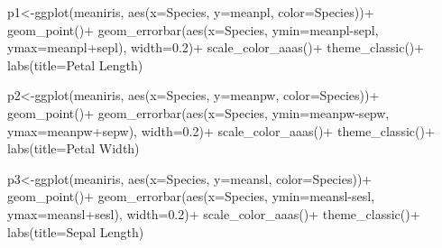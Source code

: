 \documentclass[
  letterpaper,
  DIV=11,
  numbers=noendperiod]{scrartcl}
\newenvironment{Shaded}{\begin{snugshade}}{\end{snugshade}}
\newcommand{\AttributeTok}[1]{\textcolor[rgb]{0.40,0.45,0.13}{#1}}
\newcommand{\FloatTok}[1]{\textcolor[rgb]{0.68,0.00,0.00}{#1}}
\newcommand{\FunctionTok}[1]{\textcolor[rgb]{0.28,0.35,0.67}{#1}}
\newcommand{\NormalTok}[1]{\textcolor[rgb]{0.00,0.23,0.31}{#1}}
\newcommand{\OtherTok}[1]{\textcolor[rgb]{0.00,0.23,0.31}{#1}}
\newcommand{\SpecialCharTok}[1]{\textcolor[rgb]{0.37,0.37,0.37}{#1}}
\newcommand{\StringTok}[1]{\textcolor[rgb]{0.13,0.47,0.30}{#1}}
\begin{document}
\begin{Shaded}
\begin{Highlighting}[]
\NormalTok{p1}\OtherTok{\textless{}{-}}\FunctionTok{ggplot}\NormalTok{(meaniris, }\FunctionTok{aes}\NormalTok{(}\AttributeTok{x=}\NormalTok{Species, }\AttributeTok{y=}\NormalTok{meanpl, }\AttributeTok{color=}\NormalTok{Species))}\SpecialCharTok{+}
  \FunctionTok{geom\_point}\NormalTok{()}\SpecialCharTok{+}
  \FunctionTok{geom\_errorbar}\NormalTok{(}\FunctionTok{aes}\NormalTok{(}\AttributeTok{x=}\NormalTok{Species, }\AttributeTok{ymin=}\NormalTok{meanpl}\SpecialCharTok{{-}}\NormalTok{sepl, }\AttributeTok{ymax=}\NormalTok{meanpl}\SpecialCharTok{+}\NormalTok{sepl), }\AttributeTok{width=}\FloatTok{0.2}\NormalTok{)}\SpecialCharTok{+}
  \FunctionTok{scale\_color\_aaas}\NormalTok{()}\SpecialCharTok{+}
  \FunctionTok{theme\_classic}\NormalTok{()}\SpecialCharTok{+}
  \FunctionTok{labs}\NormalTok{(}\AttributeTok{title=}\StringTok{\textquotesingle{}Petal Length\textquotesingle{}}\NormalTok{)}

\NormalTok{p2}\OtherTok{\textless{}{-}}\FunctionTok{ggplot}\NormalTok{(meaniris, }\FunctionTok{aes}\NormalTok{(}\AttributeTok{x=}\NormalTok{Species, }\AttributeTok{y=}\NormalTok{meanpw, }\AttributeTok{color=}\NormalTok{Species))}\SpecialCharTok{+}
  \FunctionTok{geom\_point}\NormalTok{()}\SpecialCharTok{+}
  \FunctionTok{geom\_errorbar}\NormalTok{(}\FunctionTok{aes}\NormalTok{(}\AttributeTok{x=}\NormalTok{Species, }\AttributeTok{ymin=}\NormalTok{meanpw}\SpecialCharTok{{-}}\NormalTok{sepw, }\AttributeTok{ymax=}\NormalTok{meanpw}\SpecialCharTok{+}\NormalTok{sepw), }\AttributeTok{width=}\FloatTok{0.2}\NormalTok{)}\SpecialCharTok{+}
  \FunctionTok{scale\_color\_aaas}\NormalTok{()}\SpecialCharTok{+}
  \FunctionTok{theme\_classic}\NormalTok{()}\SpecialCharTok{+}
  \FunctionTok{labs}\NormalTok{(}\AttributeTok{title=}\StringTok{\textquotesingle{}Petal Width\textquotesingle{}}\NormalTok{)}

\NormalTok{p3}\OtherTok{\textless{}{-}}\FunctionTok{ggplot}\NormalTok{(meaniris, }\FunctionTok{aes}\NormalTok{(}\AttributeTok{x=}\NormalTok{Species, }\AttributeTok{y=}\NormalTok{meansl, }\AttributeTok{color=}\NormalTok{Species))}\SpecialCharTok{+}
  \FunctionTok{geom\_point}\NormalTok{()}\SpecialCharTok{+}
  \FunctionTok{geom\_errorbar}\NormalTok{(}\FunctionTok{aes}\NormalTok{(}\AttributeTok{x=}\NormalTok{Species, }\AttributeTok{ymin=}\NormalTok{meansl}\SpecialCharTok{{-}}\NormalTok{sesl, }\AttributeTok{ymax=}\NormalTok{meansl}\SpecialCharTok{+}\NormalTok{sesl), }\AttributeTok{width=}\FloatTok{0.2}\NormalTok{)}\SpecialCharTok{+}
  \FunctionTok{scale\_color\_aaas}\NormalTok{()}\SpecialCharTok{+}
  \FunctionTok{theme\_classic}\NormalTok{()}\SpecialCharTok{+}
  \FunctionTok{labs}\NormalTok{(}\AttributeTok{title=}\StringTok{\textquotesingle{}Sepal Length\textquotesingle{}}\NormalTok{)}


\end{Highlighting}
\end{Shaded}
\end{document}
